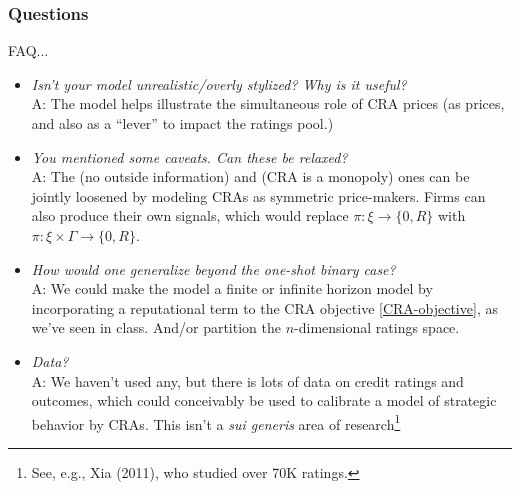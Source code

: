 \documentclass{beamer}
\begin{document}
\begin{frame}
    \frametitle{Questions}
    \scriptsize 
    FAQ...
    \begin{itemize}
        \item \emph{Isn't your model unrealistic/overly stylized? Why is it useful?} \\ 
        A: The model helps illustrate the simultaneous role of CRA prices (as prices, and also as a ``lever'' to impact the ratings pool.) 

        \item \emph{You mentioned some caveats. Can these be relaxed?} \\ 
        A: The (no outside information) and (CRA is a monopoly) ones can be jointly loosened by modeling CRAs as symmetric price-makers. Firms can also produce their own signals, which would replace $\pi: \xi \to \{0, R\}$ with $\pi: \xi \times \Gamma \to \{0, R\}$. 

        \item \emph{How would one generalize beyond the one-shot binary case?} \\ 
        A: We could make the model a finite or infinite horizon model by incorporating a reputational term to the CRA objective \eqref{CRA-objective}, as we've seen in class. And/or partition the $n$-dimensional ratings space.

        \item \emph{Data?} \\ 
        A: We haven't used any, but there is lots of data on credit ratings and outcomes, which could conceivably be used to calibrate a model of strategic behavior by CRAs. This isn't a \emph{sui generis} area of research\footnote{See, e.g., Xia (2011), who studied over 70K ratings.}
    \end{itemize}
\end{frame}
\end{document}

